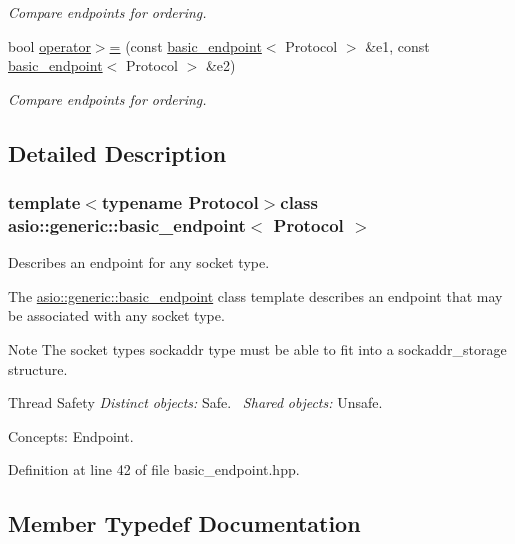 \begin{DoxyCompactItemize}
\begin{DoxyCompactList}\small\item\em Compare endpoints for ordering. \end{DoxyCompactList}\item 
bool \hyperlink{classasio_1_1generic_1_1basic__endpoint_a282ed225bbac8ae22df1b23f0e86d3a6}{operator$>$=} (const \hyperlink{classasio_1_1generic_1_1basic__endpoint}{basic\+\_\+endpoint}$<$ Protocol $>$ \&e1, const \hyperlink{classasio_1_1generic_1_1basic__endpoint}{basic\+\_\+endpoint}$<$ Protocol $>$ \&e2)
\begin{DoxyCompactList}\small\item\em Compare endpoints for ordering. \end{DoxyCompactList}\end{DoxyCompactItemize}


\subsection{Detailed Description}
\subsubsection*{template$<$typename Protocol$>$class asio\+::generic\+::basic\+\_\+endpoint$<$ Protocol $>$}

Describes an endpoint for any socket type. 

The \hyperlink{classasio_1_1generic_1_1basic__endpoint}{asio\+::generic\+::basic\+\_\+endpoint} class template describes an endpoint that may be associated with any socket type.

\begin{DoxyNote}{Note}
The socket types sockaddr type must be able to fit into a {\ttfamily sockaddr\+\_\+storage} structure.
\end{DoxyNote}
\begin{DoxyParagraph}{Thread Safety}
{\itshape Distinct} {\itshape objects\+:} Safe.~\newline
{\itshape Shared} {\itshape objects\+:} Unsafe.
\end{DoxyParagraph}
\begin{DoxyParagraph}{Concepts\+:}
Endpoint. 
\end{DoxyParagraph}


Definition at line 42 of file basic\+\_\+endpoint.\+hpp.



\subsection{Member Typedef Documentation}
\hypertarget{classasio_1_1generic_1_1basic__endpoint_af8fe7c173ad82680b104c83000eab645}{}
